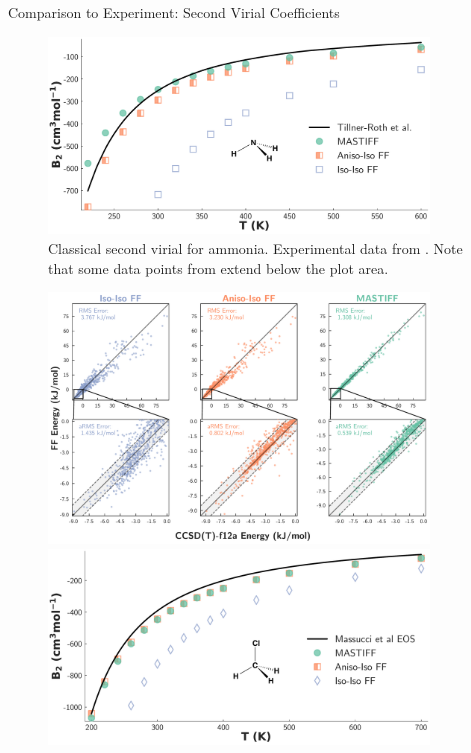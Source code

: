 \begin{subsection}{Comparison to Experiment: Second Virial Coefficients}
\begin{figure}[ht]
    \includegraphics[width=0.9\textwidth]{anisotropic/virials/nh3/nh3_2nd_virial.pdf}
    \caption{
        Classical second virial for ammonia. Experimental data from
            .
        Note that some data points from \isoff extend below the plot area.
            }
    \label{fig:nh3_virial}
    \end{figure}
    \begin{figure}[ht]
    \centering
    \includegraphics[width=0.9\textwidth]{anisotropic/scatterplots/chloromethane_chloromethane_comparison.pdf}
    \includegraphics[width=0.9\textwidth]{anisotropic/virials/chloromethane/chloromethane_2nd_virial.pdf}

\end{figure}
\end{subsection}
